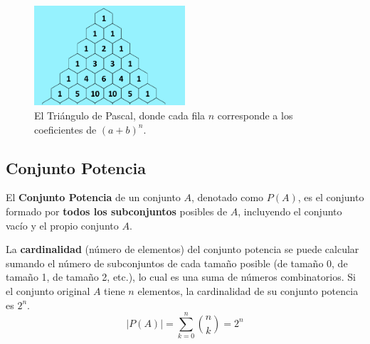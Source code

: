 \documentclass[12pt, letterpaper]{article}
\begin{document}
\begin{figure}[h!]
    \centering
    \includegraphics[width=0.5\textwidth]{pascal}
    \caption{El Triángulo de Pascal, donde cada fila $n$ corresponde a los coeficientes de $(a+b)^n$.}
    \label{fig:pascaltrig}
\end{figure}

\subsection{Conjunto Potencia}
El \textbf{Conjunto Potencia} de un conjunto $A$, denotado como $P(A)$, es el conjunto formado por \textbf{todos los subconjuntos} posibles de $A$, incluyendo el conjunto vacío y el propio conjunto $A$.

La \textbf{cardinalidad} (número de elementos) del conjunto potencia se puede calcular sumando el número de subconjuntos de cada tamaño posible (de tamaño 0, de tamaño 1, de tamaño 2, etc.), lo cual es una suma de números combinatorios. Si el conjunto original $A$ tiene $n$ elementos, la cardinalidad de su conjunto potencia es $2^n$.
\[ |P(A)| = \sum_{k=0}^{n} \binom{n}{k} = 2^n \]
\end{document}
